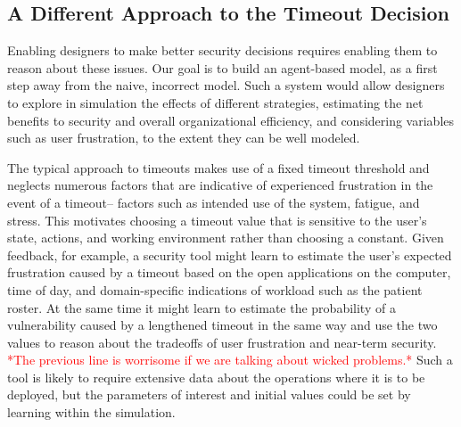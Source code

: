 \documentclass{acm_proc_article-sp}
\newcommand{\ignore}[1] {}
\begin{document}
\subsection{A Different Approach to the Timeout Decision}

Enabling designers to make better security decisions requires enabling
them to reason about these issues.  Our goal is to build an
agent-based model, as a first step away from the naive, incorrect
model. Such a system would allow designers to explore in simulation
the effects of different strategies, estimating the net benefits to
security and overall organizational efficiency, and considering
variables such as user frustration, to the extent they can be well
modeled.

\ignore{\subsection{An Alternative To The Standard Approach}}

The typical approach to timeouts makes use of a fixed timeout
threshold and neglects numerous factors that are indicative of 
experienced frustration in the event of a timeout-- factors such as 
intended use of the system, fatigue, and stress. 
This motivates choosing a timeout value that is sensitive to the
user's state, actions, and working environment rather than choosing a
constant. Given feedback, for example, a security tool might learn to
estimate the user's expected frustration caused by a timeout based on
the open applications on the computer, time of day, and
domain-specific indications of workload such as the patient roster. At
the same time it might learn to estimate the probability of a
vulnerability caused by a lengthened timeout in the same way and use
the two values to reason about the tradeoffs of user frustration and
near-term security. \textcolor{red}{*The previous line is worrisome if we 
are talking about wicked problems.*} Such a tool is likely to require extensive data
about the operations where it is to be deployed, but the parameters of
interest and initial values could be set by learning within the
simulation.

\ignore{\subsection{Why Does It Take So Long To Recognize Workarounds?}}

\ignore{\textcolor{red}{this is all speculation... just because users don't report circumvention doesn't mean that system designers will be unaware of it. some solid real-world examples would be nice here-- an image may also be useful: users of system circumvent -> no need for users to complain -> system designers don't hear about it -> security folks' mental models of system remains the same, but the system itself is flawed-- and usage of the system does not mesh with the mental model}}
\end{document}

